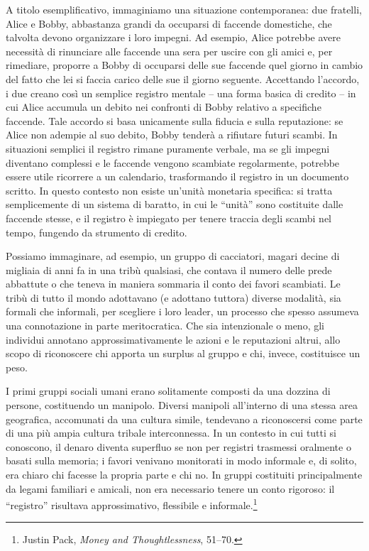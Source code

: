 \documentclass[
  a5paper,
  smalldemyvopaper,10pt,twoside,onecolumn,openright,extrafontsizes,hidelinks]{memoir}
\begin{document}
A titolo esemplificativo, immaginiamo una situazione contemporanea: due
fratelli, Alice e Bobby, abbastanza grandi da occuparsi di faccende
domestiche, che talvolta devono organizzare i loro impegni. Ad esempio,
Alice potrebbe avere necessità di rinunciare alle faccende una sera per
uscire con gli amici e, per rimediare, proporre a Bobby di occuparsi
delle sue faccende quel giorno in cambio del fatto che lei si faccia
carico delle sue il giorno seguente. Accettando l'accordo, i due creano
così un semplice registro mentale -- una forma basica di credito -- in
cui Alice accumula un debito nei confronti di Bobby relativo a
specifiche faccende. Tale accordo si basa unicamente sulla fiducia e
sulla reputazione: se Alice non adempie al suo debito, Bobby tenderà a
rifiutare futuri scambi. In situazioni semplici il registro rimane
puramente verbale, ma se gli impegni diventano complessi e le faccende
vengono scambiate regolarmente, potrebbe essere utile ricorrere a un
calendario, trasformando il registro in un documento scritto. In questo
contesto non esiste un'unità monetaria specifica: si tratta
semplicemente di un sistema di baratto, in cui le ``unità'' sono
costituite dalle faccende stesse, e il registro è impiegato per tenere
traccia degli scambi nel tempo, fungendo da strumento di credito.

Possiamo immaginare, ad esempio, un gruppo di cacciatori, magari decine
di migliaia di anni fa in una tribù qualsiasi, che contava il numero
delle prede abbattute o che teneva in maniera sommaria il conto dei
favori scambiati. Le tribù di tutto il mondo adottavano (e adottano
tuttora) diverse modalità, sia formali che informali, per scegliere i
loro leader, un processo che spesso assumeva una connotazione in parte
meritocratica. Che sia intenzionale o meno, gli individui annotano
approssimativamente le azioni e le reputazioni altrui, allo scopo di
riconoscere chi apporta un surplus al gruppo e chi, invece, costituisce
un peso.

I primi gruppi sociali umani erano solitamente composti da una dozzina
di persone, costituendo un manipolo. Diversi manipoli all'interno di una
stessa area geografica, accomunati da una cultura simile, tendevano a
riconoscersi come parte di una più ampia cultura tribale interconnessa.
In un contesto in cui tutti si conoscono, il denaro diventa superfluo se
non per registri trasmessi oralmente o basati sulla memoria; i favori
venivano monitorati in modo informale e, di solito, era chiaro chi
facesse la propria parte e chi no. In gruppi costituiti principalmente
da legami familiari e amicali, non era necessario tenere un conto
rigoroso: il ``registro'' risultava approssimativo, flessibile e
informale.\footnote{Justin Pack, \emph{Money and Thoughtlessness},
  51--70.}
\end{document}
